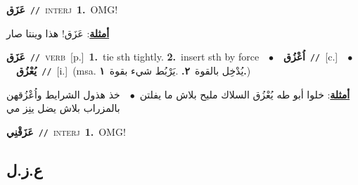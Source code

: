 \documentclass[10pt,a4paper,twoside]{article} %
\begin{document}
\begin{multicols}{2}
{\setlength\topsep{0pt}\textbf{\foreignlanguage{arabic}{عَزَق}}\ {\color{gray}\texttt{//}\color{black}}\ \textsc{interj}\ \textbf{1.}~OMG!\  \begin{flushright}\color{gray}\foreignlanguage{arabic}{\textbf{\underline{\foreignlanguage{arabic}{أمثلة}}}: عَزَق! هذا وينتا صار}\end{flushright}\color{black}} \vspace{2mm}

{\setlength\topsep{0pt}\textbf{\foreignlanguage{arabic}{عَزَق}}\ {\color{gray}\texttt{//}\color{black}}\ \textsc{verb}\ [p.]\ \textbf{1.}~tie sth tightly.  \textbf{2.}~insert sth by force\ \ $\bullet$\ \ \setlength\topsep{0pt}\textbf{\foreignlanguage{arabic}{اُعْزُق}}\ {\color{gray}\texttt{//}\color{black}}\ [c.]\ \ $\bullet$\ \ \setlength\topsep{0pt}\textbf{\foreignlanguage{arabic}{يُعْزُق}}\ {\color{gray}\texttt{//}\color{black}}\ [i.]\ \color{gray}(msa. \foreignlanguage{arabic}{يُدْخِل بالقوة}~\foreignlanguage{arabic}{\textbf{٢.}}  .\foreignlanguage{arabic}{يَرْبُط شيء بقوة}~\foreignlanguage{arabic}{\textbf{١.}})\color{black}\  \begin{flushright}\color{gray}\foreignlanguage{arabic}{\textbf{\underline{\foreignlanguage{arabic}{أمثلة}}}: خلوا أبو طه يُعْزُق السلاك مليح بلاش ما يفلتن\ $\bullet$\ \  خذ هذول الشرايط واُعْزُقهن بالمزراب بلاش يضل ينِز مي}\end{flushright}\color{black}} \vspace{2mm}

{\setlength\topsep{0pt}\textbf{\foreignlanguage{arabic}{عَزَقْنِي}}\ {\color{gray}\texttt{//}\color{black}}\ \textsc{interj}\ \textbf{1.}~OMG!\ } \vspace{2mm}

\vspace{-3mm}
\subsection*{\color{blue}\foreignlanguage{arabic}{ع.ز.ل}\color{blue}{}} 


\end{multicols}
\end{document}
